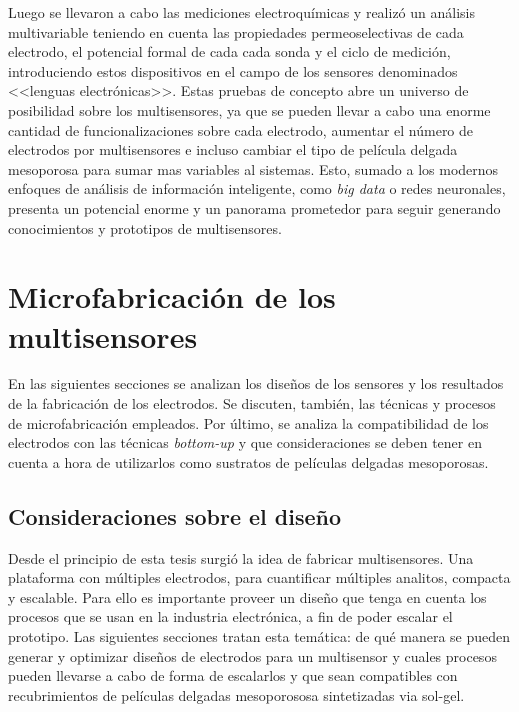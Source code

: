 	Luego se llevaron a cabo las mediciones electroquímicas y realizó un análisis multivariable teniendo en cuenta las propiedades permeoselectivas de cada electrodo, el potencial formal de cada cada sonda y el ciclo de medición, introduciendo estos dispositivos en el campo de los sensores denominados <<lenguas electrónicas>>\cite{mimendia2010,tahara2013}. Estas pruebas de concepto abre un universo de posibilidad sobre los multisensores, ya que se pueden llevar a cabo una enorme cantidad de funcionalizaciones sobre cada electrodo\cite{Jeong2012,Angelome2008,Calvo20210,Herzog2013,walcariussss2001}, aumentar el número de electrodos por multisensores e incluso cambiar el tipo de película delgada mesoporosa para sumar mas variables al sistemas. Esto, sumado a los modernos enfoques de análisis de información inteligente, como \textit{big data}\cite{bigdata2013} o redes neuronales\cite{redes2017}, presenta un potencial enorme y un panorama prometedor para seguir generando conocimientos y prototipos de multisensores.
	
\section{Microfabricación de los multisensores}\label{sec:microfabricaci_n_de_los_sensores}
		
	 	 En las siguientes secciones se analizan los diseños de los sensores y los resultados de la fabricación de los electrodos. Se discuten, también, las técnicas y procesos de microfabricación empleados. Por último, se analiza la compatibilidad de los electrodos con las técnicas \textit{bottom-up} y que consideraciones se deben tener en cuenta a hora de utilizarlos como sustratos de películas delgadas mesoporosas.

	\subsection{Consideraciones sobre el diseño}\label{sec:diseno}

			 Desde el principio de esta tesis surgió la idea de fabricar multisensores. Una plataforma con múltiples electrodos, para cuantificar múltiples analitos, compacta y escalable. Para ello es importante proveer un diseño que tenga en cuenta los procesos que se usan en la industria electrónica, a fin de poder escalar el prototipo. Las siguientes secciones tratan esta temática: de qué manera se pueden generar y optimizar diseños de electrodos para un multisensor y cuales procesos pueden llevarse a cabo de forma de escalarlos y que sean compatibles con recubrimientos de películas delgadas mesoporososa sintetizadas via sol-gel.

